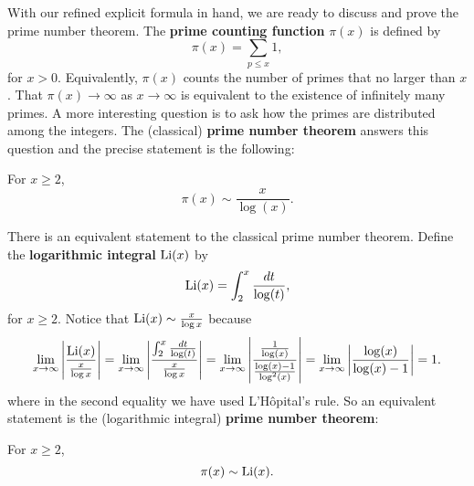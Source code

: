     With our refined explicit formula in hand, we are ready to discuss and prove the prime number theorem. The \textbf{prime counting function} $\pi(x)$ is defined by
    \[
      \pi(x) = \sum_{p \le x}1,
    \]
    for $x > 0$. Equivalently, $\pi(x)$ counts the number of primes that no larger than $x$. That $\pi(x) \to \infty$ as $x \to \infty$ is equivalent to the existence of infinitely many primes. A more interesting question is to ask how the primes are distributed among the integers. The (classical) \textbf{prime number theorem} answers this question and the precise statement is the following:

    \begin{theorem}
      For $x \ge 2$,
      \[
        \pi(x) \sim \frac{x}{\log(x)}.
      \]
    \end{theorem}

    There is an equivalent statement to the classical prime number theorem. Define the \textbf{logarithmic integral} $\operatorname{\mathrm{Li}}(x)$ by
    \[
      \operatorname{\mathrm{Li}}(x) = \int_{2}^{x}\frac{dt}{\log(t)},
    \]
    for $x \ge 2$. Notice that $\operatorname{\mathrm{Li}}(x) \sim \frac{x}{\log{x}}$ because
    \[
      \lim_{x \to \infty}\left|\frac{\operatorname{\mathrm{Li}}(x)}{\frac{x}{\log{x}}}\right| = \lim_{x \to \infty}\left|\frac{\int_{2}^{x}\frac{dt}{\log(t)}}{\frac{x}{\log{x}}}\right| = \lim_{x \to \infty}\left|\frac{\frac{1}{\log(x)}}{\frac{\log(x)-1}{\log^{2}(x)}}\right| = \lim_{x \to \infty}\left|\frac{\log(x)}{\log(x)-1}\right| = 1.
    \]
    where in the second equality we have used  L'H\^opital's rule. So an equivalent statement is the (logarithmic integral) \textbf{prime number theorem}:

    \begin{theorem}
      For $x \ge 2$,
      \[
        \pi(x) \sim \operatorname{\mathrm{Li}}(x).
      \]
    \end{theorem}

